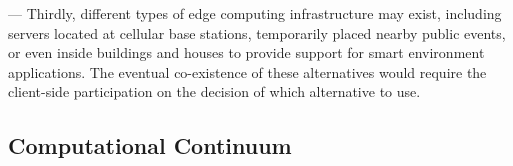
--- Thirdly, different types of edge computing infrastructure may exist, including servers located at cellular base stations, temporarily placed nearby public events, or even inside buildings and houses to provide support for smart environment applications. The eventual co-existence of these alternatives would require the client-side participation on the decision of which alternative to use.




\subsection{Computational Continuum}

